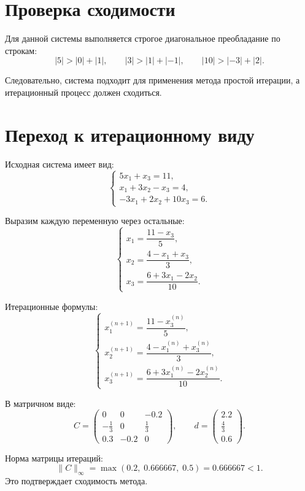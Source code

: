 \documentclass[12pt,a4paper]{article}
\begin{document}
\section{Проверка сходимости}

Для данной системы выполняется строгое диагональное преобладание по строкам:
\[
|5| > |0| + |1|,
\qquad
|3| > |1| + |-1|,
\qquad
|10| > |-3| + |2|.
\]

Следовательно, система подходит для применения метода простой итерации, а итерационный процесс должен сходиться.

\section{Переход к итерационному виду}

Исходная система имеет вид:
\[
\begin{cases}
5x_1 + x_3 = 11,\\
x_1 + 3x_2 - x_3 = 4,\\
-3x_1 + 2x_2 + 10x_3 = 6.
\end{cases}
\]

Выразим каждую переменную через остальные:
\[
\begin{cases}
x_1 = \dfrac{11 - x_3}{5},\\[2mm]
x_2 = \dfrac{4 - x_1 + x_3}{3},\\[2mm]
x_3 = \dfrac{6 + 3x_1 - 2x_2}{10}.
\end{cases}
\]

Итерационные формулы:
\[
\begin{cases}
x_1^{(n+1)} = \dfrac{11 - x_3^{(n)}}{5},\\[2mm]
x_2^{(n+1)} = \dfrac{4 - x_1^{(n)} + x_3^{(n)}}{3},\\[2mm]
x_3^{(n+1)} = \dfrac{6 + 3x_1^{(n)} - 2x_2^{(n)}}{10}.
\end{cases}
\]

В матричном виде:
\[
C =
\begin{pmatrix}
0 & 0 & -0.2\\
-\frac{1}{3} & 0 & \frac{1}{3}\\
0.3 & -0.2 & 0
\end{pmatrix},
\qquad
d =
\begin{pmatrix}
2.2\\
\frac{4}{3}\\
0.6
\end{pmatrix}.
\]

Норма матрицы итераций:
\[
\|C\|_{\infty} =
\max(0.2,\;0.666667,\;0.5) = 0.666667 < 1.
\]
Это подтверждает сходимость метода.
\end{document}
